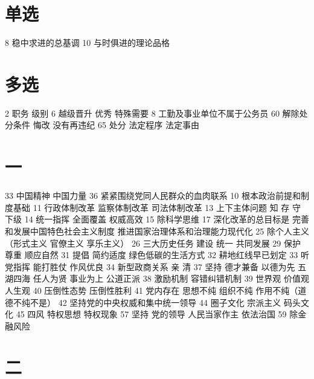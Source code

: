 \documentclass[cyan]{elegantnote}
\begin{document}
\section{单选}
\label{sec:orgc82cec5}
8 稳中求进的总基调
10 与时俱进的理论品格
\section{多选}
\label{sec:org298a0b8}
2 职务 级别
6 越级晋升 优秀 特殊需要
8 工勤及事业单位不属于公务员
60 解除处分条件 悔改 没有再违纪
65 处分 法定程序 法定事由
\section{一}
\label{sec:orge9be16d}
33 中国精神 中国力量
36 紧紧围绕党同人民群众的血肉联系
10 根本政治前提和制度基础
11 行政体制改革 监察体制改革 司法体制改革
13 上下主体问题 知 存 守 下级
14 统一指挥 全面覆盖 权威高效
15 除科学思维
17 深化改革的总目标是
完善和发展中国特色社会主义制度
推进国家治理体系和治理能力现代化
25 除个人主义（形式主义 官僚主义 享乐主义）
26 三大历史任务 建设 统一 共同发展
29 保护 尊重 顺应自然
31 提倡 简约适度 绿色低碳的生活方式
32 耕地红线早已划定
33 听党指挥 能打胜仗 作风优良
34 新型政商关系 亲 清
37 坚持 德才兼备 以德为先 五湖四海 任人为贤 事业为上 公道正派
38 激励机制 容错纠错机制
39 世界观 价值观 人生观
40 压倒性态势 压倒性胜利
41 党内存在 思想不纯 组织不纯 作用不纯（道德不纯不是）
42 坚持党的中央权威和集中统一领导
44 圈子文化 宗派主义 码头文化
45 四风 特权思想 特权现象
57 坚持 党的领导 人民当家作主 依法治国
59 除金融风险
\section{二}
\label{sec:org2d8132a}
\end{document}
